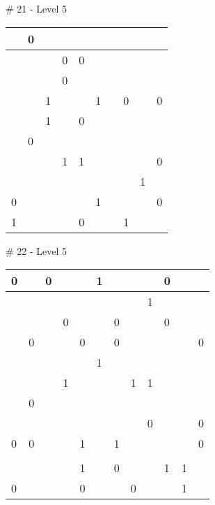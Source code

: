 \medskip

\# 21 - Level 5 \newline
\begin{tabular}{|m{\collen}|m{\collen}|m{\collen}|m{\collen}|m{\collen}|m{\collen}|m{\collen}|m{\collen}|m{\collen}|m{\collen}|}
\hline
    & 0 &   &   &   &   &   &   &   &   \\
\hline
    &   &   & 0 & 0 &   &   &   &   &   \\
\hline
    &   &   & 0 &   &   &   &   &   &   \\
\hline
    &   & 1 &   &   & 1 &   & 0 &   & 0 \\
\hline
    &   & 1 &   & 0 &   &   &   &   &   \\
\hline
    & 0 &   &   &   &   &   &   &   &   \\
\hline
    &   &   & 1 & 1 &   &   &   &   & 0 \\
\hline
    &   &   &   &   &   &   &   & 1 &   \\
\hline
  0 &   &   &   &   & 1 &   &   &   & 0 \\
\hline
  1 &   &   &   & 0 &   &   & 1 &   &   \\
\hline
\end{tabular}


\medskip

\# 22 - Level 5 \newline
\begin{tabular}{|m{\collen}|m{\collen}|m{\collen}|m{\collen}|m{\collen}|m{\collen}|m{\collen}|m{\collen}|m{\collen}|m{\collen}|m{\collen}|m{\collen}|}
\hline
  0 &   & 0 &   &   & 1 &   &   &   & 0 &   &   \\
\hline
    &   &   &   &   &   &   &   & 1 &   &   &   \\
\hline
    &   &   & 0 &   &   & 0 &   &   & 0 &   &   \\
\hline
    & 0 &   &   & 0 &   & 0 &   &   &   &   & 0 \\
\hline
    &   &   &   &   & 1 &   &   &   &   &   &   \\
\hline
    &   &   & 1 &   &   &   & 1 & 1 &   &   &   \\
\hline
    & 0 &   &   &   &   &   &   &   &   &   &   \\
\hline
    &   &   &   &   &   &   &   & 0 &   &   & 0 \\
\hline
  0 & 0 &   &   & 1 &   & 1 &   &   &   &   & 0 \\
\hline
    &   &   &   &   &   &   &   &   &   &   &   \\
\hline
    &   &   &   & 1 &   & 0 &   &   & 1 & 1 &   \\
\hline
  0 &   &   &   & 0 &   &   & 0 &   &   & 1 &   \\
\hline
\end{tabular}


